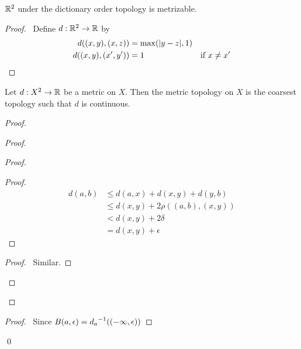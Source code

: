 \begin{proposition}
    $\RR^2$ under the dictionary order topology is metrizable.
\end{proposition}

\begin{proof}
    \pf\ Define $d : \RR^2 \rightarrow \RR$ by
    \begin{align*}
        d((x,y),(x,z)) & = \max(|y-z|,1) \\
        d((x,y),(x',y')) & = 1 & \text{if } x \neq x' \qed
    \end{align*}        
\end{proof}

\begin{proposition}
    \label{proposition:continuous_distance}
    Let $d : X^2 \rightarrow \RR$ be a metric on $X$. Then the metric topology on $X$ is the coarsest topology such that $d$ is continuous.
\end{proposition}

\begin{proof}
    \pf
    \begin{proof}
        \begin{proof}
            \begin{proof}
                \pf
                \begin{align*}
                    d(a,b) & \leq d(a,x) + d(x,y) + d(y,b) \\
                    & \leq d(x,y) + 2 \rho((a,b),(x,y)) \\
                    & < d(x,y) + 2 \delta \\
                    & = d(x,y) + \epsilon
                \end{align*}
            \end{proof}
            \begin{proof}
                \pf\ Similar.
            \end{proof}
        \end{proof}
        \qedstep
    \end{proof}
    \begin{proof}
        \pf\ Since $B(a, \epsilon) = \inv{d_a}((-\infty, \epsilon))$
    \end{proof}
    \qed    
\end{proof}


